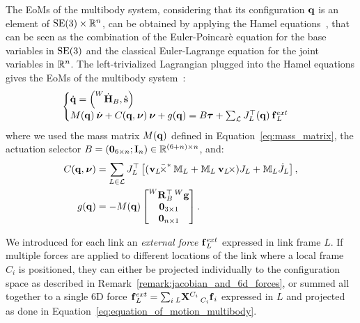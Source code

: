 The \aclp{EoM} of the multibody system, considering that its configuration $\Qu$ is an element of $\SE(3)\times\realn^n$, can be obtained by applying the Hamel equations~\parencite{marsden_jerrold_e_introduction_2010, maruskin_dynamical_2018}, that can be seen as the combination of the Euler-Poincarè equation for the base variables in $\SE(3)$ and the classical Euler-Lagrange equation for the joint variables in $\realn^n$.
The left-trivialized Lagrangian plugged into the Hamel equations gives the \acp{EoM} of the multibody system~\parencite[Appendix~A.4]{traversaro_modelling_2017}:
%
\begin{equation}
    \label{eq:equation_of_motion_multibody}
    \begin{cases}
        \Qud = \left( \homod[W]_B, \Shaped \right)  \\
        M(\Qu) \Nud + C(\Qu, \Nu) \Nu + g(\Qu) = B \Torques + \sum_{\mathcal{L}} J_{L}^\top(\Qu) \forcesix_L^{ext}
    \end{cases}
\end{equation}
%
where we used the mass matrix $M(\Qu)$ defined in Equation~\eqref{eq:mass_matrix}, the actuation selector $B = (\zeros_{6\times n}; \eye_n) \in \realn^{(6+n)\times n}$, and:
%
\begin{align*}
    C(\Qu, \Nu) &= \sum_{L\in\mathcal{L}} J_L^\top \left[ (\crossforsix[\velsix_L] \masssix_L + \masssix_L \crossvelsix[\velsix_L]) J_L + \masssix_L \dot{J}_L \right] ,\\
    g(\Qu) &= -M(\Qu) \begin{bmatrix}\rot[W]_B^\top \gravity[W] \\ \zeros_{3\times1} \\ \zeros_{n\times1}\end{bmatrix}
    .
\end{align*}

\begin{remark*}
%
We introduced for each link an \emph{external force} $\forcesix_L^{ext}$ expressed in link frame $L$.
If multiple forces are applied to different locations of the link where a local frame $C_i$ is positioned, they can either be projected individually to the configuration space as described in Remark~\ref{remark:jacobian_and_6d_forces}, or summed all together to a single 6D force $\forcesix_L^{ext} = \sum_i \transfor[L]^{C_i} \forcesix[C_i]_i$ expressed in $L$ and projected as done in Equation~\eqref{eq:equation_of_motion_multibody}.
%
\end{remark*}

